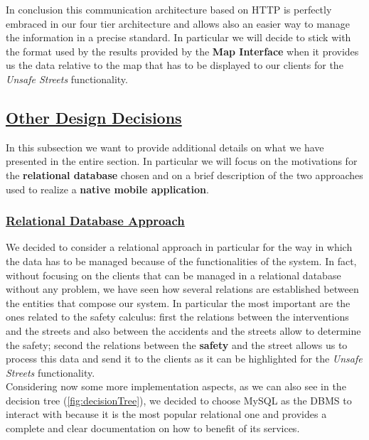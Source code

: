 			In conclusion this communication architecture based on HTTP is perfectly embraced in our four tier architecture and allows also an easier way to manage the information in a precise standard. In particular we will decide to stick with the format used by the results provided by the \textbf{Map Interface} when it provides us the data relative to the map that has to be displayed to our clients for the \emph{Unsafe Streets} functionality.
			
		
	\subsection[Other Design Decisions]{\hyperlink{toc}{Other Design Decisions}}
		\label{sec:otherDesignDecisions}						
		
		In this subsection we want to provide additional details on what we have presented in the entire section. In particular we will focus on the motivations for the \textbf{relational database} chosen and on a brief description of the two approaches used to realize a \textbf{native mobile application}.
		
		\subsubsection[Relational Database Approach]{\hyperlink{toc}{Relational Database Approach}}
			\label{sec:relationaldbApproach}
			
			We decided to consider a relational approach in particular for the way in which the data has to be managed because of the functionalities of the system. In fact, without focusing on the clients that can be managed in a relational database without any problem, we have seen how several relations are established between the entities that compose our system. In particular the most important are the ones related to the safety calculus: first the relations between the interventions and the streets and also between the accidents and the streets allow to determine the safety; second the relations between the \textbf{safety} and the street allows us to process this data and send it to the clients as it can be highlighted for the \emph{Unsafe Streets} functionality.\\
			
			Considering now some more implementation aspects, as we can also see in the decision tree (\autoref{fig:decisionTree}), we decided to choose MySQL as the DBMS to interact with because it is the most popular relational one and provides a complete and clear documentation on how to benefit of its services.
			
